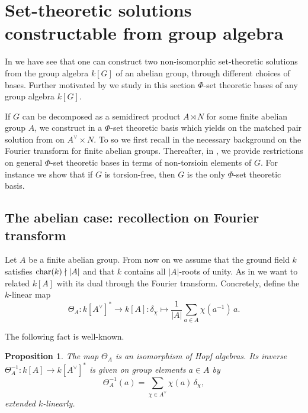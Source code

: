 \documentclass[a4paper,10pt]{amsart}
\newtheorem{proposition}[lemma]{Proposition}
\theoremstyle{definition}
\theoremstyle{remark}
\newcommand\Char{{\rm char}}
\begin{document}
\section{Set-theoretic solutions constructable from group algebra}\label{solutions from grp alg}

In  we have see that one can construct two non-isomorphic set-theoretic solutions from the group algebra $k[G]$ of an abelian group, through different choices of bases. Further motivated by  we study in this section $\Phi$-set theoretic bases of any group algebra $k[G]$.

If $G$ can be decomposed as a semidirect product $A \rtimes N$ for some finite abelian group $A$, we construct in  a $\Phi$-set theoretic basis which yields on the matched pair solution from   on $A^{\vee} \times N.$ To so we first recall in  the necessary background on the Fourier transform for finite abelian groups. Thereafter, in , we provide restrictions on general $\Phi$-set theoretic bases in terms of non-torsioin elements of $G$. For instance we show that if $G$ is torsion-free, then $G$ is the only $\Phi$-set theoretic basis. 

\subsection{The abelian case: recollection on Fourier transform}\label{fourier transform section}
Let $A$ be a finite abelian group. From now on we assume that the ground field $k$ satisfies $\Char(k) \nmid |A|$ and that $k$ contains all $|A|$-roots of unity. As in  we want to related $k[A]$ with its dual through the Fourier transform. Concretely, define the $k$-linear map
\begin{equation}\label{eq:ThetaDef}
\Theta_A:k[A^\vee]^*\longrightarrow k[A]: \delta_\chi \mapsto \frac{1}{|A|}\sum_{a\in A}\chi(a^{-1})\,a.
\end{equation}

The following fact is well-known.

\begin{proposition}\label{prop:ThetaInv}
The map $\Theta_A$ is an isomorphism of Hopf algebras. Its inverse $\Theta_A^{-1}:k[A]\to k[A^\vee]^*$ is given on group elements $a \in A$ by
\begin{equation}\label{eq:ThetaInv}
\Theta_A^{-1}(a)=\sum_{\chi\in A^\vee}\chi(a)\,\delta_\chi,
\end{equation}
extended $k$-linearly.
\end{proposition}
\end{document}
